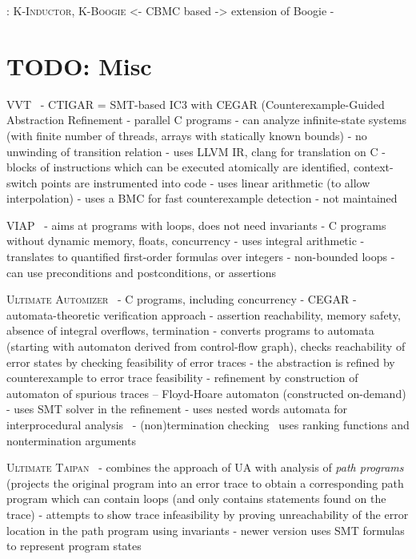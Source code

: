 \cite{Donaldson2011}: \textsc{K-Inductor}, \textsc{K-Boogie}
<- CBMC based
-> extension of Boogie
- 

\section{TODO: Misc}

VVT~\cite{Gunther2016}
- CTIGAR = SMT-based IC3 with CEGAR (Counterexample-Guided Abstraction Refinement 
- parallel C programs
- can analyze infinite-state systems (with finite number of threads, arrays with statically known bounds)
- no unwinding of transition relation
- uses LLVM IR, clang for translation on C
- blocks of instructions which can be executed atomically are identified, context-switch points are instrumented into code
- uses linear arithmetic (to allow interpolation)
- uses a BMC for fast counterexample detection
- not maintained

VIAP~\cite{Rajkhowa2019,Rajkhowa2017}
- aims at programs with loops, does not need invariants
- C programs without dynamic memory, floats, concurrency
- uses integral arithmetic
- translates to quantified first-order formulas over integers
- non-bounded loops
- can use preconditions and postconditions, or assertions

\textsc{Ultimate Automizer}~\cite{Heizmann2017,Heizmann2013}
- C programs, including concurrency
- CEGAR
- automata-theoretic verification approach
- assertion reachability, memory safety, absence of integral overflows, termination
- converts programs to automata (starting with automaton derived from control-flow graph), checks reachability of error states by checking feasibility of error traces
  - the abstraction is refined by counterexample to error trace feasibility
  - refinement by construction of automaton of spurious traces -- Floyd-Hoare automaton (constructed on-demand)
  - uses SMT solver in the refinement
- uses nested words automata for interprocedural analysis~\cite{TODO}
- (non)termination checking~\cite{TODO: Buchy automizer} uses ranking functions and nontermination arguments

\textsc{Ultimate Taipan}~\cite{Dietsch2020,Greitschus2017}
- combines the approach of UA with analysis of \emph{path programs} (projects the original program into an error trace to obtain a corresponding path program which can contain loops (and only contains statements found on the trace)
- attempts to show trace infeasibility by proving unreachability of the error location in the path program using invariants
- newer version uses SMT formulas to represent program states

